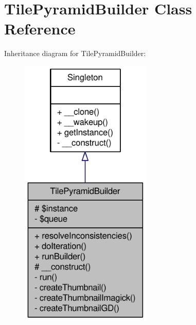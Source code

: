 \hypertarget{classTilePyramidBuilder}{
\section{TilePyramidBuilder Class Reference}
\label{classTilePyramidBuilder}
}


Inheritance diagram for TilePyramidBuilder:\nopagebreak
\begin{figure}[H]
\begin{center}
\leavevmode
\includegraphics[width=176pt]{classTilePyramidBuilder__inherit__graph}
\end{center}
\end{figure}


